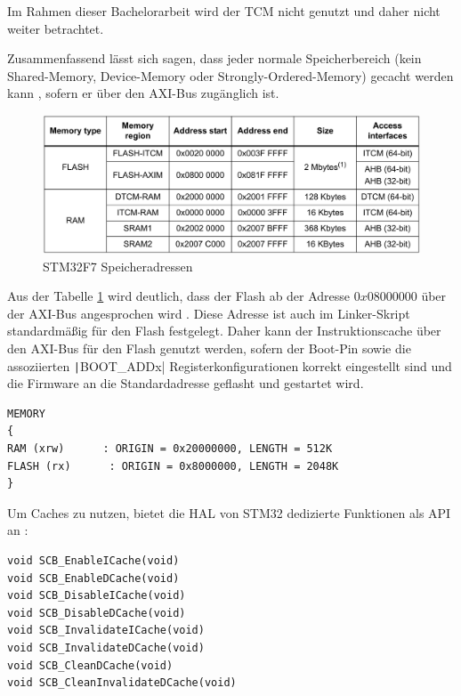Im Rahmen dieser Bachelorarbeit wird der TCM nicht genutzt und daher nicht
weiter betrachtet.

Zusammenfassend lässt sich sagen, dass jeder normale Speicherbereich (kein
Shared-Memory, Device-Memory oder Strongly-Ordered-Memory) gecacht werden kann
\cite[S. 7]{an4667}, sofern er über den AXI-Bus zugänglich ist.

\begin{figure}[htb]
    \centering
    \includegraphics[width=1\textwidth]{assets/internal_mem_table}
    \caption{STM32F7 Speicheradressen \cite[S. 14]{an4667}}
    \label{fig:internal_mem_table}
\end{figure}

Aus der Tabelle \ref{fig:internal_mem_table} wird deutlich, dass der Flash ab
der Adresse $0x0800 0000$ über der AXI-Bus angesprochen wird . Diese Adresse ist
auch im Linker-Skript standardmäßig für den Flash festgelegt. Daher kann der
Instruktionscache über den AXI-Bus für den Flash genutzt werden, sofern der
Boot-Pin sowie die assoziierten \texttt|BOOT_ADDx|
Registerkonfigurationen korrekt eingestellt sind \cite[S. 28]{stm32_datasheet}
und die Firmware an die Standardadresse geflasht und gestartet wird.

\begin{code}
\begin{verbatim}
MEMORY
{
RAM (xrw)      : ORIGIN = 0x20000000, LENGTH = 512K
FLASH (rx)      : ORIGIN = 0x8000000, LENGTH = 2048K
}
\end{verbatim}
\end{code}

Um Caches zu nutzen, bietet die \ac{HAL} von STM32 dedizierte Funktionen als API
an \cite[S. 4]{an4839}:

\begin{code}
\begin{verbatim}
void SCB_EnableICache(void)
void SCB_EnableDCache(void)
void SCB_DisableICache(void)
void SCB_DisableDCache(void)
void SCB_InvalidateICache(void)
void SCB_InvalidateDCache(void)
void SCB_CleanDCache(void)
void SCB_CleanInvalidateDCache(void)
\end{verbatim}
\end{code}


